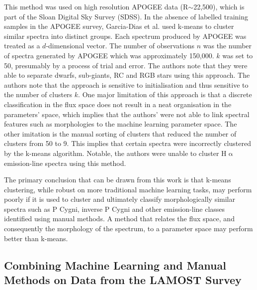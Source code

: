 This method was used on high resolution APOGEE data (R$\sim$22,500), which is part of the Sloan Digital Sky Survey (SDSS)\cite{eisenstein2001spectroscopic}\cite{blanton2017sloan}. In the absence of labelled training samples in the APOGEE survey, Garcia-Dias et al. used k-means to cluster similar spectra into distinct groups\cite{garcia2018machine}. Each spectrum produced by APOGEE was treated as a $d$-dimensional vector. The number of observations $n$ was the number of spectra generated by APOGEE which was approximately 150,000. $k$ was set to 50, presumably by a process of trial and error. The authors note that they were able to separate dwarfs, sub-giants, RC and RGB stars using this approach. The authors note that the approach is sensitive to initialisation and thus sensitive to the number of clusters $k$. One major limitation of this approach is that a discrete classification in the flux space does not result in a neat organisation in the parameters' space, which implies that the authors' were not able to link spectral features such as morphologies to the machine learning parameter space. The other imitation is the manual sorting of clusters that reduced the number of clusters from 50 to 9. This implies that certain spectra were incorrectly clustered by the k-means algorithm. Notable, the authors were unable to cluster H$\upalpha$ emission-line spectra using this method. 

The primary conclusion that can be drawn from this work is that k-means clustering, while robust on more traditional machine learning tasks, may perform poorly if it is used to cluster and ultimately classify morphologically similar spectra such as P Cygni, inverse P Cygni and other emission-line classes identified using manual methods. A method that relates the flux space, and consequently the morphology of the spectrum, to a parameter space may perform better than k-means. 

\subsection{Combining Machine Learning and Manual Methods on Data from the LAMOST Survey}

